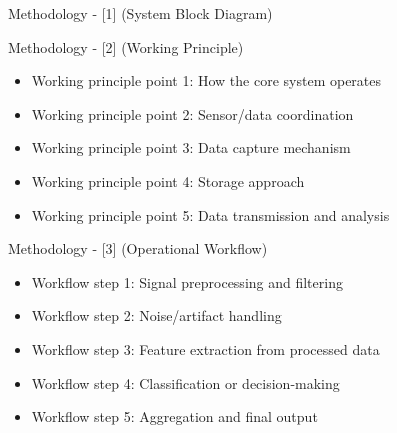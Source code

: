 
\begin{frame}{Methodology - [1] (System Block Diagram)}
    \begin{center}
        \vspace{1em}
    \end{center}
\end{frame}

\begin{frame}{Methodology - [2] (Working Principle)}
    \begin{itemize}
        \item Working principle point 1: How the core system operates
        \item Working principle point 2: Sensor/data coordination
        \item Working principle point 3: Data capture mechanism
        \item Working principle point 4: Storage approach
        \item Working principle point 5: Data transmission and analysis
    \end{itemize}
\end{frame}

\begin{frame}{Methodology - [3] (Operational Workflow)}
    \begin{itemize}
        \item Workflow step 1: Signal preprocessing and filtering
        \item Workflow step 2: Noise/artifact handling
        \item Workflow step 3: Feature extraction from processed data
        \item Workflow step 4: Classification or decision-making
        \item Workflow step 5: Aggregation and final output
    \end{itemize}
\end{frame}

